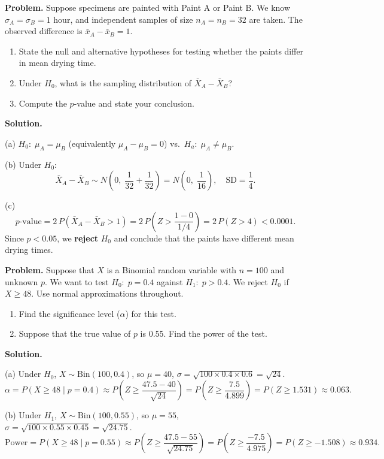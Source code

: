\documentclass[10pt]{report}
\begin{document}
\begin{hwbox}
\textbf{Problem.} Suppose specimens are painted with Paint A or Paint B. We know $\sigma_A = \sigma_B = 1$ hour, and independent samples of size $n_A = n_B = 32$ are taken. The observed difference is $\bar{x}_A - \bar{x}_B = 1$.

\begin{enumerate}[label=(\alph*)]
  \item State the null and alternative hypotheses for testing whether the paints differ in mean drying time.
  \item Under $H_0$, what is the sampling distribution of $\bar{X}_A - \bar{X}_B$?
  \item Compute the $p$-value and state your conclusion.
\end{enumerate}

\textbf{Solution.}

(a) $H_0{:}\; \mu_A = \mu_B$ (equivalently $\mu_A - \mu_B = 0$) vs.\ $H_a{:}\; \mu_A \neq \mu_B$.

(b) Under $H_0$:
\[
\bar{X}_A - \bar{X}_B \sim N\!\left(0,\; \frac{1}{32} + \frac{1}{32}\right) = N\!\left(0,\; \frac{1}{16}\right),
\quad \text{SD} = \frac{1}{4}.
\]

(c)
\[
p\text{-value} = 2\,P\!\left(\bar{X}_A - \bar{X}_B > 1\right) = 2\,P\!\left(Z > \frac{1 - 0}{1/4}\right) = 2\,P(Z > 4) < 0.0001.
\]
Since $p < 0.05$, we \textbf{reject} $H_0$ and conclude that the paints have different mean drying times.
\end{hwbox}

\begin{hwbox}
\textbf{Problem.} Suppose that $X$ is a Binomial random variable with $n = 100$ and unknown $p$. We want to test $H_0{:}\; p = 0.4$ against $H_1{:}\; p > 0.4$. We reject $H_0$ if $X \geq 48$. Use normal approximations throughout.

\begin{enumerate}[label=(\alph*)]
  \item Find the significance level ($\alpha$) for this test.
  \item Suppose that the true value of $p$ is 0.55. Find the power of the test.
\end{enumerate}

\textbf{Solution.}

(a) Under $H_0$, $X \sim \text{Bin}(100, 0.4)$, so $\mu = 40$, $\sigma = \sqrt{100 \times 0.4 \times 0.6} = \sqrt{24}$.
\[
\alpha = P(X \geq 48 \mid p = 0.4) \approx P\!\left(Z \geq \frac{47.5 - 40}{\sqrt{24}}\right) = P\!\left(Z \geq \frac{7.5}{4.899}\right) = P(Z \geq 1.531) \approx \boxed{0.063.}
\]

(b) Under $H_1$, $X \sim \text{Bin}(100, 0.55)$, so $\mu = 55$, $\sigma = \sqrt{100 \times 0.55 \times 0.45} = \sqrt{24.75}$.
\[
\text{Power} = P(X \geq 48 \mid p = 0.55) \approx P\!\left(Z \geq \frac{47.5 - 55}{\sqrt{24.75}}\right) = P\!\left(Z \geq \frac{-7.5}{4.975}\right) = P(Z \geq -1.508) \approx \boxed{0.934.}
\]
\end{hwbox}
\end{document}
